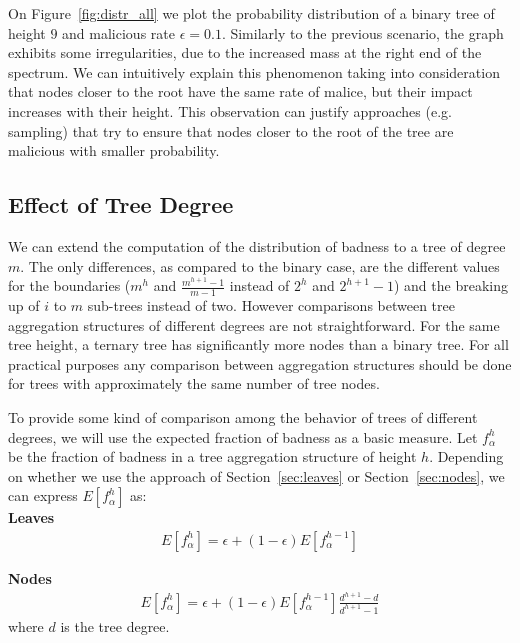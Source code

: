 \documentclass[11pt,twocolumn]{MyTightStyle}
\theoremstyle{plain}
\theoremstyle{definition}
\theoremstyle{remark}
\numberwithin{equation}{section}
\begin{document}
  On Figure~\ref{fig:distr_all} we plot the probability distribution
  of a binary tree of height $9$ and malicious rate
  $\epsilon=0.1$. Similarly to the previous scenario, the graph
  exhibits some irregularities, due to the increased mass at the right
  end of the spectrum. We can intuitively explain this phenomenon
  taking into consideration that nodes closer to the root have the
  same rate of malice, but their impact increases with their
  height. This observation can justify approaches (e.g. sampling) that try to ensure
  that nodes closer to the root of the tree are malicious with smaller
  probability. 
  
  \subsection{Effect of Tree Degree}
  \label{sec:degree}
  We can extend the computation of the distribution of badness to a
  tree of degree $m$. The only differences, as compared to the binary
  case, are the different values for the boundaries ($m^h$ and
  $\frac{m^{h+1}-1}{m-1}$ instead of $2^h$ and $2^{h+1}-1$) and the
  breaking up of $i$ to $m$ sub-trees instead of two. However
  comparisons between tree aggregation structures of different degrees
  are not straightforward. For the same tree height, a ternary tree
  has significantly more nodes than a binary tree. For all practical
  purposes any comparison between aggregation structures should be done
  for trees with approximately the same number of tree nodes.

  To provide some kind of comparison among the behavior of trees of
  different degrees, we will use the expected fraction of badness as a
  basic measure.  Let $f^h_\alpha$ be the fraction of badness in a
  tree aggregation structure of height $h$. Depending on whether we
  use the approach of Section~\ref{sec:leaves} or
  Section~\ref{sec:nodes}, we can express $E[f^h_{\alpha}]$ as:\\
  
  {\bf Leaves}\\
  \begin{eqnarray}
    E[f^h_\alpha] = \epsilon + (1-\epsilon)E[f^{h-1}_\alpha]
  \end{eqnarray}

  {\bf Nodes}\\
  \begin{eqnarray}
    E[f^h_\alpha] = \epsilon + (1-\epsilon)E[f^{h-1}_\alpha]\frac{d^{h+1}-d}{d^{h+1}-1}
  \end{eqnarray}
  where $d$ is the tree degree.
\end{document}
